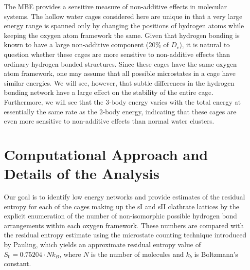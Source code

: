 \documentclass[11pt, proquest]{uwthesis}[2020/02/24]
\newcommand{\textapprox}{\raisebox{0.5ex}{\texttildelow}}
\begin{document}
\par The MBE provides a sensitive measure of non-additive effects in molecular systems. The hollow water cages considered here are unique in that a very large energy range is spanned only by changing the positions of hydrogen atoms while keeping the oxygen atom framework the same. Given that hydrogen bonding is known to have a large non-additive component (\textapprox20\% of $D_e$),\autocite{xantheas_cooperativity_2000} it is natural to question whether these cages are more sensitive to non-additive effects than ordinary hydrogen bonded structures. Since these cages have the same oxygen atom framework, one may assume that all possible microstates in a cage have similar energies. We will see, however, that subtle differences in the hydrogen bonding network have a large effect on the stability of the entire cage. Furthermore, we will see that the 3-body energy varies with the total energy at essentially the same rate as the 2-body energy, indicating that these cages are even more sensitive to non-additive effects than normal water clusters.

\section{Computational Approach and Details of the Analysis}

\par Our goal is to identify low energy networks and provide estimates of the residual entropy for each of the cages making up the sI and sII clathrate lattices by the explicit enumeration of the number of non-isomorphic possible hydrogen bond arrangements within each oxygen framework. These numbers are compared with the residual entropy estimate using the microstate counting technique introduced by Pauling,\autocite{pauling_structure_1935} which yields an approximate residual entropy value of $S_0=0.75204\cdot Nk_B$, where $N$ is the number of molecules and $k_b$ is Boltzmann’s constant.
\end{document}
